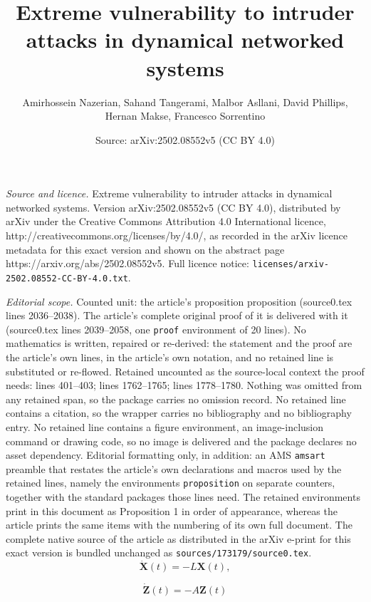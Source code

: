 \documentclass[10pt,a4paper]{amsart}
\title{Extreme vulnerability to intruder attacks in dynamical networked systems}
\author{Amirhossein Nazerian, Sahand Tangerami, Malbor Asllani, David Phillips, Hernan Makse, Francesco Sorrentino}
\date{Source: arXiv:2502.08552v5 (CC BY 4.0)}
\def \bX {\pmb{X}}
\def \bZ {\pmb{Z}}
\begin{document}
\maketitle

\noindent\emph{Source and licence.} Extreme vulnerability to intruder attacks in dynamical networked systems. Version arXiv:2502.08552v5 (CC BY 4.0), distributed by arXiv under the Creative Commons Attribution 4.0 International licence, http://creativecommons.org/licenses/by/4.0/, as recorded in the arXiv licence metadata for this exact version and shown on the abstract page https://arxiv.org/abs/2502.08552v5. Full licence notice: \texttt{licenses/arxiv-2502.08552-CC-BY-4.0.txt}.\par\smallskip

\noindent\textit{Editorial scope.} Counted unit: the article's proposition proposition (source0.tex lines 2036--2038). The article's complete original proof of it is delivered with it (source0.tex lines 2039--2058, one \texttt{proof} environment of 20 lines). No mathematics is written, repaired or re-derived: the statement and the proof are the article's own lines, in the article's own notation, and no retained line is substituted or re-flowed.  Retained uncounted as the source-local context the proof needs: lines 401--403; lines 1762--1765; lines 1778--1780.  Nothing was omitted from any retained span, so the package carries no omission record.  No retained line contains a citation, so the wrapper carries no bibliography and no bibliography entry.  No retained line contains a figure environment, an image-inclusion command or drawing code, so no image is delivered and the package declares no asset dependency.  Editorial formatting only, in addition: an AMS \texttt{amsart} preamble that restates the article's own declarations and macros used by the retained lines, namely the environments \texttt{proposition} on separate counters, together with the standard packages those lines need.  The retained environments print in this document as Proposition 1 in order of appearance, whereas the article prints the same items with the numbering of its own full document.  The complete native source of the article as distributed in the arXiv e-print for this exact version is bundled unchanged as \texttt{sources/173179/source0.tex}.
\begin{equation} \label{consensus}
    \dot{\bX} (t) = -L \bX(t),
\end{equation}

\begin{equation}
\label{transverse}
    \dot{\bZ}(t) = -A \bZ(t)
\end{equation}
\end{document}
